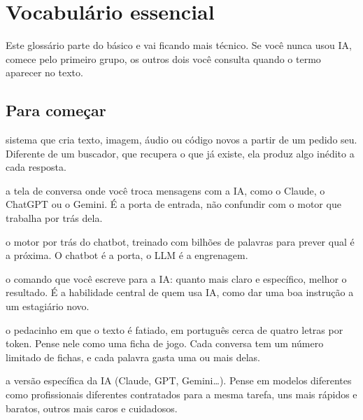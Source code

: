 \documentclass[11pt,a4paper]{article}
\begin{document}
\clearpage
\thispagestyle{empty}
\vspace*{0.2cm}
\setcounter{tocdepth}{1}
\renewcommand{\contentsname}{Sumário}
\tableofcontents

\clearpage

\section{Vocabulário essencial}
\small
Este glossário parte do básico e vai ficando mais técnico. Se você nunca usou IA, comece pelo primeiro grupo, os outros dois você consulta quando o termo aparecer no texto.

\subsection*{Para começar}
\begin{description}[style=nextline,leftmargin=0pt,itemsep=6pt]
  \item[\poppinsmed\color{azulUNI}IA generativa] sistema que cria texto, imagem, áudio ou código novos a partir de um pedido seu. Diferente de um buscador, que recupera o que já existe, ela produz algo inédito a cada resposta.
  \item[\poppinsmed\color{azulUNI}Chatbot/assistente conversacional] a tela de conversa onde você troca mensagens com a IA, como o Claude, o ChatGPT ou o Gemini. É a porta de entrada, não confundir com o motor que trabalha por trás dela.
  \item[\poppinsmed\color{azulUNI}LLM (Modelo de Linguagem Grande)] o motor por trás do chatbot, treinado com bilhões de palavras para prever qual é a próxima. O chatbot é a porta, o LLM é a engrenagem.
  \item[\poppinsmed\color{azulUNI}Prompt] o comando que você escreve para a IA: quanto mais claro e específico, melhor o resultado. É a habilidade central de quem usa IA, como dar uma boa instrução a um estagiário novo.
  \item[\poppinsmed\color{azulUNI}Token] o pedacinho em que o texto é fatiado, em português cerca de quatro letras por token. Pense nele como uma ficha de jogo. Cada conversa tem um número limitado de fichas, e cada palavra gasta uma ou mais delas.
  \item[\poppinsmed\color{azulUNI}Modelo] a versão específica da IA (Claude, GPT, Gemini\ldots). Pense em modelos diferentes como profissionais diferentes contratados para a mesma tarefa, uns mais rápidos e baratos, outros mais caros e cuidadosos.
\end{description}
\end{document}
